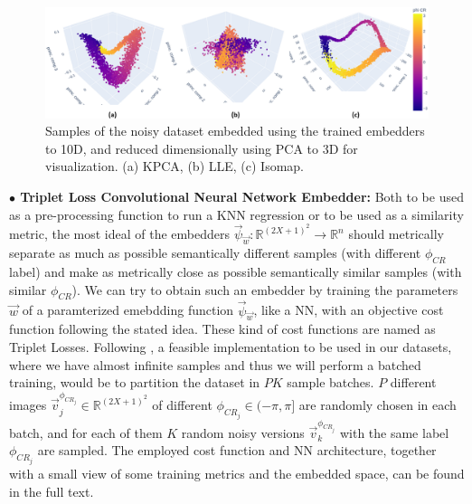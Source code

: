 \documentclass[11pt, a4paper, twoside]{article} %
\newcommand{\R}{\mathbb{R}} %
\begin{document}
\begin{figure}[h!] 
     \centering 
    \includegraphics[width=0.96\linewidth]{emb2.PNG}
    \caption{ Samples of the noisy dataset embedded using the trained embedders to 10D, and reduced dimensionally using PCA to 3D for visualization. (a) KPCA, (b) LLE, (c) Isomap.  }
    \label{fig:embeddings2}\vspace{-0.3cm}
\end{figure}
{\bf $\bullet$ Triplet Loss Convolutional Neural Network Embedder:} Both to be used as a pre-processing function to run a KNN regression or to be used as a similarity metric, the most ideal of the embedders $\vec{\psi}_{\vec{w}}:\R^{(2X+1)^2}\rightarrow \R^n$ should metrically separate as much as possible semantically different samples (with different $\phi_{CR}$ label) and make as metrically close as possible semantically similar samples (with similar $\phi_{CR}$). We can try to obtain such an embedder by training the parameters $\vec{w}$ of a paramterized emebdding function $\vec{\psi}_{\vec{w}}$, like a NN, with an objective cost function following the stated idea. These kind of cost functions are named as Triplet Losses. Following \cite{triplet}, a feasible implementation to be used in our datasets, where we have almost infinite samples and thus we will perform a batched training, would be to partition the dataset in $PK$ sample batches. $P$ different images $\vec{v}_j^{\phi_{CR_j}}\in\R^{(2X+1)^2}$ of different $\phi_{CR_j}\in(-\pi,\pi]$ are randomly chosen in each batch, and for each of them $K$ random noisy versions $\vec{v}_k^{\phi_{CR_j}}$ with the same label $\phi_{CR_j}$ are sampled. The employed cost function and NN architecture, together with a small view of some training metrics and the embedded space, can be found in the full text. \vspace{-0.3cm}
\end{document}
